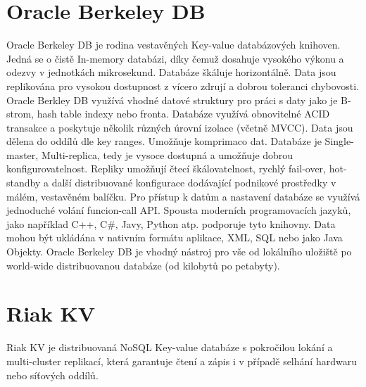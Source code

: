 \documentclass[czech,bachelor,dept460,male,csharp,cpdeclaration]{diploma}
\begin{document}
	\section{Oracle Berkeley DB}
	
	Oracle Berkeley DB\cite{oraclenosqldb} je rodina vestavěných Key-value databázových knihoven. Jedná se o čistě In-memory databázi, díky čemuž dosahuje vysokého výkonu a odezvy v jednotkách mikrosekund. Databáze škáluje horizontálně. Data jsou replikována pro vysokou dostupnost z vícero zdrují a dobrou toleranci chybovosti. Oracle Berkley DB využívá vhodné datové struktury pro práci s daty jako je B-strom, hash table indexy nebo fronta. Databáze využívá obnovitelné ACID transakce a poskytuje několik různých úrovní izolace (včetně MVCC\cite{mvcc}). Data jsou dělena do oddílů dle key ranges. Umožňuje komprimaco dat. Databáze je Single-master, Multi-replica, tedy je vysoce dostupná a umožňuje dobrou konfigurovatelnost. Repliky umožňují čtecí škálovatelnost, rychlý fail-over, hot-standby a další distribuované konfigurace dodávající podnikové prostředky v málém, vestavěném balíčku. Pro přístup k datům a nastavení databáze se využívá jednoduché volání funcion-call API. Spousta moderních programovacích jazyků, jako například C++, C\#, Javy, Python atp. podporuje tyto knihovny. Data mohou být ukládána v nativním formátu aplikace, XML, SQL nebo jako Java Objekty. Oracle Berkeley DB je vhodný nástroj pro vše od lokálního uložiště po world-wide distribuovanou databáze (od kilobytů po petabyty).
	
	\section{Riak KV}
	
	Riak KV\cite{riak} je distribuovaná NoSQL Key-value databáze s pokročilou lokání a multi-cluster replikací, která garantuje čtení a zápis i v případě selhání hardwaru nebo síťových oddílů.
	
\end{document}
